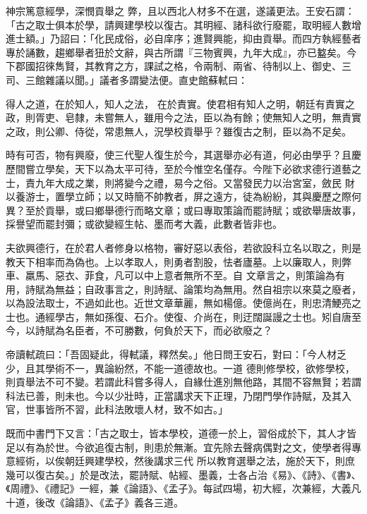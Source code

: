 \begin{pinyinscope}
 神宗篤意經學，深憫貢舉之
 弊，且以西北人材多不在選，遂議更法。王安石謂：「古之取士俱本於學，請興建學校以復古。其明經、諸科欲行廢罷，取明經人數增進士額。」乃詔曰：「化民成俗，必自庠序；進賢興能，抑由貢舉。而四方執經藝者專於誦數，趨鄉舉者狃於文辭，與古所謂『三物賓興，九年大成』，亦已盭矣。今下郡國招徠雋賢，其教育之方，課試之格，令兩制、兩省、待制以上、御史、三司、三館雜議以聞。」議者多謂變法便。直史館蘇軾曰：



 得人之道，在於知人，知人之法，
 在於責實。使君相有知人之明，朝廷有責實之政，則胥吏、皂隸，未嘗無人，雖用今之法，臣以為有餘；使無知人之明，無責實之政，則公卿、侍從，常患無人，況學校貢舉乎？雖復古之制，臣以為不足矣。



 時有可否，物有興廢，使三代聖人復生於今，其選舉亦必有道，何必由學乎？且慶歷間嘗立學矣，天下以為太平可待，至於今惟空名僅存。今陛下必欲求德行道藝之士，責九年大成之業，則將變今之禮，易今之俗。又當發民力以治宮室，斂民
 財以養游士，置學立師；以又時簡不帥教者，屏之遠方，徒為紛紛，其與慶歷之際何異？至於貢舉，或曰鄉舉德行而略文章；或曰專取策論而罷詩賦；或欲舉唐故事，採譽望而罷封彌；或欲變經生帖、墨而考大義，此數者皆非也。



 夫欲興德行，在於君人者修身以格物，審好惡以表俗，若欲設科立名以取之，則是教天下相率而為偽也。上以孝取人，則勇者割股，怯者廬墓。上以廉取人，則弊車、羸馬、惡衣、菲食，凡可以中上意者無所不至。自
 文章言之，則策論為有用，詩賦為無益；自政事言之，則詩賦、論策均為無用。然自祖宗以來莫之廢者，以為設法取士，不過如此也。近世文章華麗，無如楊億。使億尚在，則忠清鯁亮之士也。通經學古，無如孫復、石介。使復、介尚在，則迂闊誕謾之士也。矧自唐至今，以詩賦為名臣者，不可勝數，何負於天下，而必欲廢之？



 帝讀軾疏曰：「吾固疑此，得軾議，釋然矣。」他日問王安石，對曰：「今人材乏少，且其學術不一，異論紛然，不能一道德故也。一道
 德則修學校，欲修學校，則貢舉法不可不變。若謂此科嘗多得人，自緣仕進別無他路，其間不容無賢；若謂科法已善，則未也。今以少壯時，正當講求天下正理，乃閉門學作詩賦，及其入官，世事皆所不習，此科法敗壞人材，致不如古。」



 既而中書門下又言：「古之取士，皆本學校，道德一於上，習俗成於下，其人才皆足以有為於世。今欲追復古制，則患於無漸。宜先除去聲病偶對之文，使學者得專意經術，以俟朝廷興建學校，然後講求三代
 所以教育選舉之法，施於天下，則庶幾可以復古矣。」於是改法，罷詩賦、帖經、墨義，士各占治《易》、《詩》、《書》、《周禮》、《禮記》一經，兼《論語》、《孟子》。每試四場，初大經，次兼經，大義凡十道，後改《論語》、《孟子》義各三道。




\end{pinyinscope}
